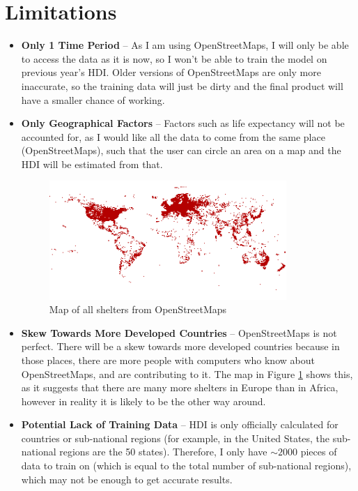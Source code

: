\documentclass[12pt]{report}
\begin{document}
\section{Limitations}
\begin{itemize}
    \item \textbf{Only 1 Time Period} -- As I am using OpenStreetMaps, I will only be able to access the data as it is now, so I won't be able to train the model on previous year's HDI. Older versions of OpenStreetMaps are only more inaccurate, so the training data will just be dirty and the final product will have a smaller chance of working.
    \item \textbf{Only Geographical Factors} -- Factors such as life expectancy will not be accounted for, as I would like all the data to come from the same place (OpenStreetMaps), such that the user can circle an area on a map and the HDI will be estimated from that.
    \begin{figure}[H]
        \centering
        \includegraphics[width=9cm]{limitationShelter.png}
        \caption{Map of all shelters from OpenStreetMaps}\label{fig:skewMap}
    \end{figure}
    \item \textbf{Skew Towards More Developed Countries} -- OpenStreetMaps is not perfect. There will be a skew towards more developed countries because in those places, there are more people with computers who know about OpenStreetMaps, and are contributing to it. The map in Figure \ref{fig:skewMap} shows this, as it suggests that there are many more shelters in Europe than in Africa, however in reality it is likely to be the other way around.
    \item \textbf{Potential Lack of Training Data} -- HDI is only officially calculated for countries or sub-national regions (for example, in the United States, the sub-national regions are the 50 states). Therefore, I only have $\sim 2000$ pieces of data to train on (which is equal to the total number of sub-national regions), which may not be enough to get accurate results.
\end{itemize}
\end{document}
